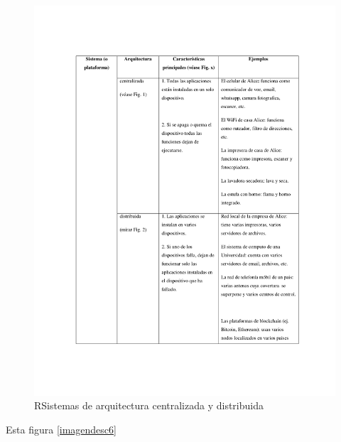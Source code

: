 \documentclass[12pt]{report} %
\begin{document}
	



\begin{figure}
\centering
\includegraphics[width=0.85\columnwidth]{imagenes/imagendesc5.pdf}
\caption{RSistemas de arquitectura centralizada y distribuida}
\label{imagendesc5.pdf}
\end{figure} 

Esta figura \ref{imagendesc6}
\end{document}
